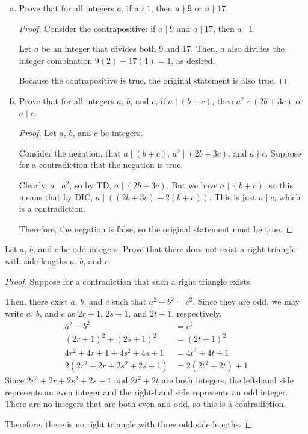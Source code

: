 \documentclass{agony}
\begin{document}
\question \begin{enumerate}[(a)]
  \item Prove that for all integers $a$, if $a \nmid 1$, then $a \nmid 9$ or $a \nmid 17$.
        \begin{proof}
          Consider the contrapositive: if $a \mid 9$ and $a \mid 17$, then $a \mid 1$.

          Let $a$ be an integer that divides both 9 and 17.
          Then, $a$ also divides the integer combination $9(2) - 17(1) = 1$, as desired.

          Because the contrapositive is true, the original statement is also true.
        \end{proof}
  \item Prove that for all integers $a$, $b$, and $c$, if $a \mid (b + c)$,
        then $a^2 \nmid (2b + 3c)$ or $a\mid c$.
        \begin{proof}
          Let $a$, $b$, and $c$ be integers.

          Consider the negation, that $a \mid (b+c)$, $a^2 \mid (2b+3c)$, and $a \nmid c$.
          Suppose for a contradiction that the negation is true.

          Clearly, $a \mid a^2$, so by TD, $a \mid (2b+3c)$.
          But we have $a \mid (b+c)$, so this means that by DIC, $a \mid ((2b+3c)-2(b+c))$.
          This is just $a \mid c$, which is a contradiction.

          Therefore, the negation is false, so the original statement must be true.
        \end{proof}
\end{enumerate}


\question Let $a$, $b$, and $c$ be odd integers.
Prove that there does not exist a right triangle with side lengths $a$, $b$, and $c$.
\begin{proof}
  Suppose for a contradiction that such a right triangle exists.

  Then, there exist $a$, $b$, and $c$ such that $a^2+b^2=c^2$.
  Since they are odd, we may write $a$, $b$, and $c$ as $2r+1$, $2s+1$, and $2t+1$, respectively.
  \begin{align*}
    a^2 + b^2                     & = c^2              \\
    (2r+1)^2 + (2s+1)^2           & = (2t+1)^2         \\
    4r^2 + 4r + 1 + 4s^2 + 4s + 1 & = 4t^2 + 4t + 1    \\
    2(2r^2 + 2r + 2s^2 + 2s + 1)  & = 2(2t^2 + 2t) + 1
  \end{align*}
  Since $2r^2 + 2r + 2s^2 + 2s + 1$ and $2t^2 + 2t$ are both integers,
  the left-hand side represents an even integer and the right-hand side represents an odd integer.
  There are no integers that are both even and odd, so this is a contradiction.

  Therefore, there is no right triangle with three odd side lengths.
\end{proof}
\end{document}
